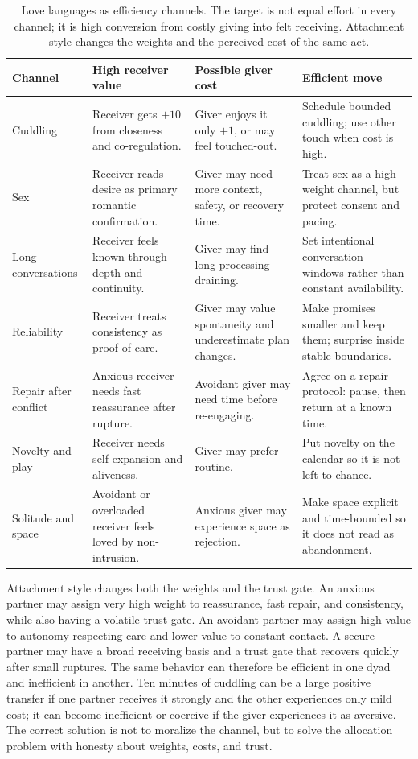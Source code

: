 \documentclass[11pt]{article}
\begin{document}
\begin{table}[ht]
\centering
\small
\begin{tabular}{L{.18\linewidth}L{.23\linewidth}L{.23\linewidth}L{.20\linewidth}}
\toprule
Channel & High receiver value & Possible giver cost & Efficient move \\
\midrule
Cuddling & Receiver gets $+10$ from closeness and co-regulation. & Giver enjoys it only $+1$, or may feel touched-out. & Schedule bounded cuddling; use other touch when cost is high. \\
Sex & Receiver reads desire as primary romantic confirmation. & Giver may need more context, safety, or recovery time. & Treat sex as a high-weight channel, but protect consent and pacing. \\
Long conversations & Receiver feels known through depth and continuity. & Giver may find long processing draining. & Set intentional conversation windows rather than constant availability. \\
Reliability & Receiver treats consistency as proof of care. & Giver may value spontaneity and underestimate plan changes. & Make promises smaller and keep them; surprise inside stable boundaries. \\
Repair after conflict & Anxious receiver needs fast reassurance after rupture. & Avoidant giver may need time before re-engaging. & Agree on a repair protocol: pause, then return at a known time. \\
Novelty and play & Receiver needs self-expansion and aliveness. & Giver may prefer routine. & Put novelty on the calendar so it is not left to chance. \\
Solitude and space & Avoidant or overloaded receiver feels loved by non-intrusion. & Anxious giver may experience space as rejection. & Make space explicit and time-bounded so it does not read as abandonment. \\
\bottomrule
\end{tabular}
\caption{Love languages as efficiency channels. The target is not equal effort in every channel; it is high conversion from costly giving into felt receiving. Attachment style changes the weights and the perceived cost of the same act.}
\label{tab:language-optimization}
\end{table}

Attachment style changes both the weights and the trust gate. An anxious partner may assign very high weight to reassurance, fast repair, and consistency, while also having a volatile trust gate. An avoidant partner may assign high value to autonomy-respecting care and lower value to constant contact. A secure partner may have a broad receiving basis and a trust gate that recovers quickly after small ruptures. The same behavior can therefore be efficient in one dyad and inefficient in another. Ten minutes of cuddling can be a large positive transfer if one partner receives it strongly and the other experiences only mild cost; it can become inefficient or coercive if the giver experiences it as aversive. The correct solution is not to moralize the channel, but to solve the allocation problem with honesty about weights, costs, and trust.
\end{document}
